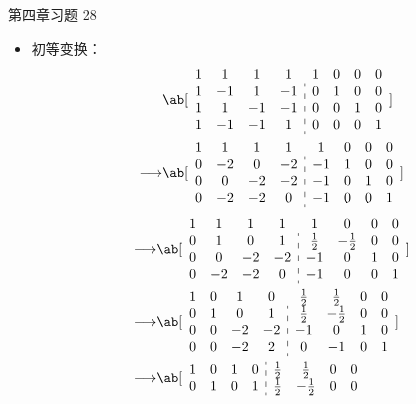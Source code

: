 \begin{problem}
	第四章习题 28

	\begin{solution}
		\begin{itemize}
			\item 初等变换：
			$$
			\begin{aligned}
				& \ab[\begin{array}{cccc:cccc}
					1 & 1 & 1 & 1 & 1 & 0 & 0 & 0 \\
					1 & -1 & 1 & -1 & 0 & 1 & 0 & 0 \\
					1 & 1 & -1 & -1 & 0 & 0 & 1 & 0 \\
					1 & -1 & -1 & 1 & 0 & 0 & 0 & 1				
				\end{array}] \\
				\longrightarrow & \ab[\begin{array}{cccc:cccc}
					1 & 1 & 1 & 1 & 1 & 0 & 0 & 0 \\
					0 & -2 & 0 & -2 & -1 & 1 & 0 & 0 \\
					0 & 0 & -2 & -2 & -1 & 0 & 1 & 0 \\
					0 & -2 & -2 & 0 & -1 & 0 & 0 & 1
				\end{array}]
			\end{aligned}
			$$
			$$
			\begin{aligned}
				\longrightarrow & \ab[\begin{array}{cccc:cccc}
					1 & 1 & 1 & 1 & 1 & 0 & 0 & 0 \\
					0 & 1 & 0 & 1 & \frac{1}{2} & -\frac{1}{2} & 0 & 0 \\
					0 & 0 & -2 & -2 & -1 & 0 & 1 & 0 \\
					0 & -2 & -2 & 0 & -1 & 0 & 0 & 1
				\end{array}] \\
				\longrightarrow & \ab[\begin{array}{cccc:cccc}
					1 & 0 & 1 & 0 & \frac{1}{2} & \frac{1}{2} & 0 & 0 \\
					0 & 1 & 0 & 1 & \frac{1}{2} & -\frac{1}{2} & 0 & 0 \\
					0 & 0 & -2 & -2 & -1 & 0 & 1 & 0 \\
					0 & 0 & -2 & 2 & 0 & -1 & 0 & 1
				\end{array}] \\
				\longrightarrow & \ab[\begin{array}{cccc:cccc}
					1 & 0 & 1 & 0 & \frac{1}{2} & \frac{1}{2} & 0 & 0 \\
					0 & 1 & 0 & 1 & \frac{1}{2} & -\frac{1}{2} & 0 & 0 \\

\end{array}
\end{aligned}$$
\end{itemize}
\end{solution}
\end{problem}
